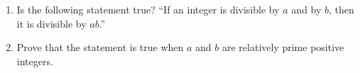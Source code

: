 \begin{enumerate}
\item[(a)] Is the following statement true? ``If an integer is divisible by $a$ and by $b$, then it is divisible by $ab$.''
\item[(b)] Prove that the statement is true when $a$ and $b$ are relatively prime positive integers.
\end{enumerate}
